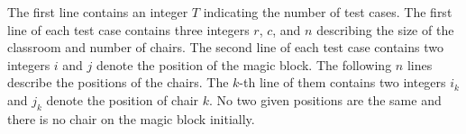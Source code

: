 The first line contains an integer $T$ indicating the number of test cases.
The first line of each test case contains three integers $r$, $c$, and $n$ describing the size of the classroom and number of chairs. 
The second line of each test case contains two integers $i$ and $j$ denote the position of the magic block. 
The following $n$ lines describe the positions of the chairs. 
The $k$-th line of them contains two integers $i_k$ and $j_k$ denote the position of chair $k$.
No two given positions are the same and there is no chair on the magic block initially.
